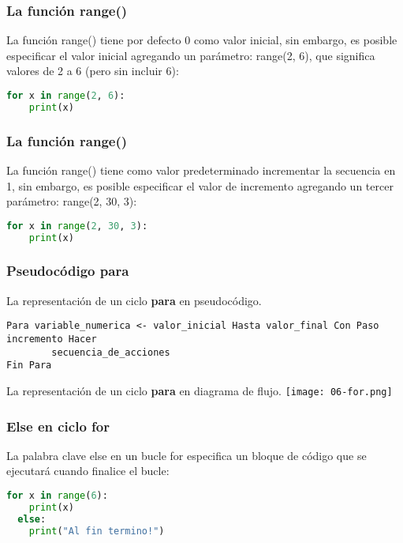 \begin{frame}[fragile]
  \frametitle{La función \textbf{range}()}

  La función \textcolor{codeKeyword2}{range}() tiene por defecto 0
  como valor inicial, sin embargo, es posible especificar el valor
  inicial agregando un parámetro: \textcolor{codeKeyword2}{range}(2, 6),
  que significa valores de 2 a 6 (pero sin incluir 6):

  \vspace{\baselineskip}
  \begin{lstlisting}[language=Python]
  for x in range(2, 6):
    print(x)
  \end{lstlisting}
\end{frame}

\begin{frame}[fragile]
  \frametitle{La función \textbf{range}()}

  La función \textcolor{codeKeyword2}{range}() tiene como valor
  predeterminado incrementar la secuencia en 1, sin embargo, es
  posible especificar el valor de incremento agregando un tercer
  parámetro: \textcolor{codeKeyword2}{range}(2, 30, 3):

  \vspace{\baselineskip}
  \begin{lstlisting}[language=Python]
  for x in range(2, 30, 3):
    print(x)
  \end{lstlisting}
\end{frame}

\begin{frame}[fragile]
  \frametitle{Pseudocódigo \textbf{para}}
  La representación de un ciclo \textbf{para} en pseudocódigo.
  \begin{lstlisting}[style=pseudocodigo]
Para variable_numerica <- valor_inicial Hasta valor_final Con Paso incremento Hacer
		secuencia_de_acciones
Fin Para
  \end{lstlisting}

  La representación de un ciclo \textbf{para} en diagrama de flujo.
  \texttt{[image: 06-for.png]}
\end{frame}


\begin{frame}[fragile]
  \frametitle{\textbf{Else} en ciclo \textbf{for}}

  La palabra clave \textcolor{codeKeyword2}{else} en un bucle for
  especifica un bloque de código que se ejecutará cuando
  finalice el bucle:

  \vspace{\baselineskip}
  \begin{lstlisting}[language=Python]
  for x in range(6):
    print(x)
  else:
    print("Al fin termino!")
  \end{lstlisting}
\end{frame}

